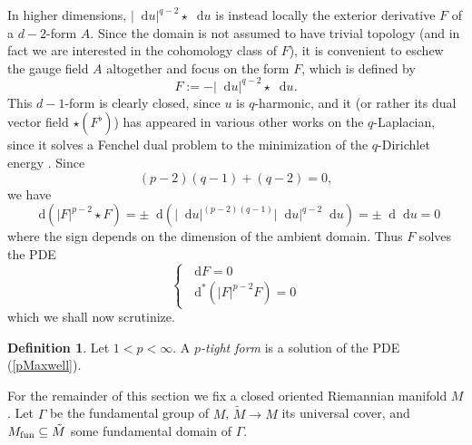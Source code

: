 \documentclass[reqno,11pt]{amsart}
\newcommand*\dif{\mathop{}\!\mathrm{d}}
\newcommand{\dfn}[1]{\emph{#1}\index{#1}}
\theoremstyle{definition}
\newtheorem{definition}[theorem]{Definition}
\numberwithin{equation}{section}
\begin{document}
In higher dimensions, $|\dif u|^{q - 2} \star \dif u$ is instead locally the exterior derivative $F$ of a $d - 2$-form $A$.
Since the domain is not assumed to have trivial topology (and in fact we are interested in the cohomology class of $F$), it is convenient to eschew the gauge field $A$ altogether and focus on the form $F$, which is defined by 
\begin{equation}\label{dual solution}
F := -|\dif u|^{q - 2} \star \dif u.
\end{equation}
This $d - 1$-form is clearly closed, since $u$ is $q$-harmonic, and it (or rather its dual vector field $\star(F^\flat)$) has appeared in various other works on the $q$-Laplacian, since it solves a Fenchel dual problem to the minimization of the $q$-Dirichlet energy \cite[Chapter IV]{Ekeland99}.
Since
\begin{equation}\label{holder cancellation}
	(p - 2)(q - 1) + (q - 2) = 0,
\end{equation}
we have 
$$\dif(|F|^{p - 2} \star F) = \pm \dif(|\dif u|^{(p - 2)(q - 1)} |\dif u|^{q - 2} \dif u) = \pm \dif \dif u = 0$$
where the sign depends on the dimension of the ambient domain.
Thus $F$ solves the PDE 
\begin{equation}\label{pMaxwell}
\begin{cases}
	\dif F = 0 \\
	\dif^* (|F|^{p - 2} F) = 0
\end{cases}
\end{equation}
which we shall now scrutinize.

\begin{definition}
Let $1 < p < \infty$.
A \dfn{$p$-tight form} is a solution of the PDE (\ref{pMaxwell}).
\end{definition}

For the remainder of this section we fix a closed oriented Riemannian manifold $M$.
Let $\Gamma$ be the fundamental group of $M$, $\tilde M \to M$ its universal cover, and $M_{\rm fun} \subseteq \tilde M$ some fundamental domain of $\Gamma$.
\end{document}
